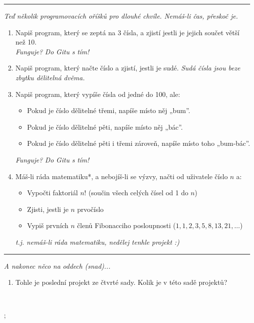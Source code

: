 \documentclass[a4paper,10pt]{article}
\newcommand\startsection[1]{
     \vspace{0.2ex}
    \hrule
    {\fontspec{Oxygen} \tiny
     \vspace{-1ex}
     \emph{#1}
     \vspace{-1.5em}
    }
}
\begin{document}
\startsection{Teď několik programovacích oříšků pro dlouhé chvíle. Nemáš-li čas, přeskoč je.}

\begin{enumerate}[resume]

\item Napiš program, který se zeptá na 3 čísla,
    a zjistí jestli je jejich součet větší než 10.
    \\\emph{\small Funguje? Do Gitu s tím!}

\item Napiš program, který načte číslo a zjistí, jestli je sudé.
    \emph{\small Sudá čísla jsou beze \emph{zbytku} dělitelná dvěma.}

\item Napiš program, který vypíše čísla od jedné do 100, ale:
    \begin{itemize}
        \item Pokud je číslo dělitelné třemi, napíše místo něj „bum”.
        \item Pokud je číslo dělitelné pěti, napíše místo něj „bác”.
        \item Pokud je číslo dělitelné pěti i třemi zároveň, napíše místo toho „bum-bác”.
    \end{itemize}
    \emph{\small Funguje? Do Gitu s tím!}

\item Máš-li ráda matematiku*, a nebojíš-li se výzvy, načti od uživatele číslo $n$ a:
    \begin{itemize}
        \item Vypočti faktoriál $n!$ (součin všech celých čísel od 1 do $n$)
        \item Zjisti, jestli je $n$ prvočíslo
        \item Vypiš prvních $n$ členů Fibonacciho posloupnosti ($1, 1, 2, 3, 5, 8, 13, 21, \ldots $)
    \end{itemize}
    \emph{\small * t.j. nemáš-li ráda matematiku, nedělej tenhle projekt :)}

\end{enumerate}

\startsection{A nakonec něco na oddech (snad)...}

\begin{enumerate}[resume]
\item Tohle je poslední projekt ze čtvrté sady. Kolik je v této sadě projektů?

\end{enumerate}

\vfill
\hfill~%
\begin{tikz}
;
\end{tikz}
\end{document}
